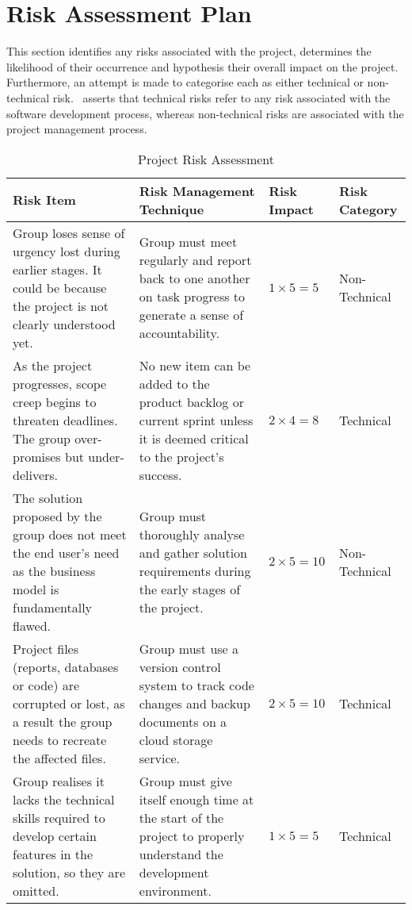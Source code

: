 \section{Risk Assessment Plan}

This section identifies any risks associated with the project, determines the likelihood of their occurrence and hypothesis their overall impact on the project. Furthermore, an attempt is made to categorise each as either technical or non-technical risk.~\parencite{dawson} asserts that technical risks refer to any risk associated with the software development process, whereas non-technical risks are associated with the project management process.

\begin{table}
  \caption{Project Risk Assessment}
  \label{tab:runtime}
  \begin{tabular*}{14.0cm}{p{4.0cm}p{5.0cm}p{1.5cm}p{2cm}}
    \toprule
    Risk Item & Risk Management Technique & Risk Impact & Risk Category \\
    \midrule
    Group loses sense of urgency lost during earlier stages. It could be because the project is not clearly understood yet. & Group must meet regularly and report back to one another on task progress to generate a sense of accountability. & $1 \times 5 = 5$ & Non-Technical \\
    \addlinespace[0.5em]
    As the project progresses, scope creep begins to threaten deadlines. The group over-promises but under-delivers. & No new item can be added to the product backlog or current sprint unless it is deemed critical to the project’s success. & $2 \times 4 = 8$ & Technical \\
    The solution proposed by the group does not meet the end user’s need as the business model is fundamentally flawed. & Group must thoroughly analyse and gather solution requirements during the early stages of the project. & $2 \times 5 = 10$ & Non-Technical \\
    \addlinespace[0.5em]
    Project files (reports, databases or code) are corrupted or lost, as a result the group needs to recreate the affected files. & Group must use a version control system to track code changes and backup documents on a cloud storage service. & $2 \times 5 = 10$ & Technical \\
    \addlinespace[0.5em]
    Group realises it lacks the technical skills required to develop certain features in the solution, so they are omitted. & Group must give itself enough time at the start of the project to properly understand the development environment. & $1 \times 5 = 5$ & Technical \\

\end{tabular*}
\end{table}
